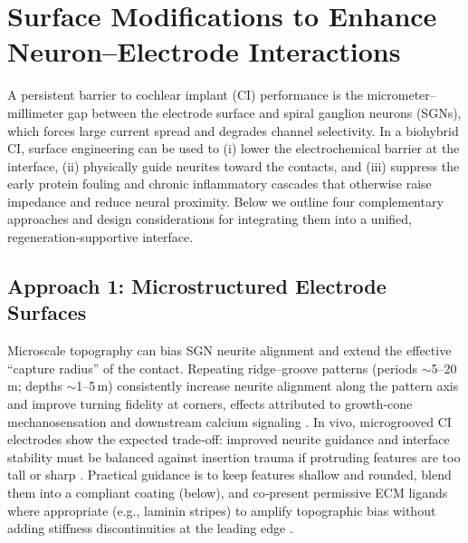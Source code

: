 \section{Surface Modifications to Enhance Neuron--Electrode Interactions}
\label{sec:surface_mods}

A persistent barrier to cochlear implant (CI) performance is the micrometer–millimeter gap between the electrode surface and spiral ganglion neurons (SGNs), which forces large current spread and degrades channel selectivity. In a biohybrid CI, surface engineering can be used to (i) lower the electrochemical barrier at the interface, (ii) physically guide neurites toward the contacts, and (iii) suppress the early protein fouling and chronic inflammatory cascades that otherwise raise impedance and reduce neural proximity. Below we outline four complementary approaches and design considerations for integrating them into a unified, regeneration‑supportive interface.

\subsection{Approach 1: Microstructured Electrode Surfaces}
Microscale topography can bias SGN neurite alignment and extend the effective “capture radius” of the contact. Repeating ridge–groove patterns (periods $\sim$5–20\,\textmu m; depths $\sim$1–5\,\textmu m) consistently increase neurite alignment along the pattern axis and improve turning fidelity at corners, effects attributed to growth‑cone mechanosensation and downstream calcium signaling \cite{Wang2013,Chen2014}. In vivo, microgrooved CI electrodes show the expected trade‑off: improved neurite guidance and interface stability must be balanced against insertion trauma if protruding features are too tall or sharp \cite{Lee2019}. Practical guidance is to keep features shallow and rounded, blend them into a compliant coating (below), and co‑present permissive ECM ligands where appropriate (e.g., laminin stripes) to amplify topographic bias without adding stiffness discontinuities at the leading edge \cite{Evans2007LamininFibronectin,Vega1995LamininCollagenIV}.

